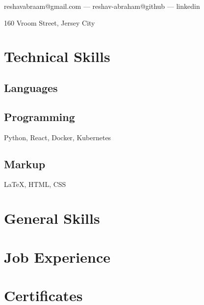 \documentclass{article}
\makeatletter
\renewcommand{\maketitle}{
\begin{center}
{\huge\bfseries
\theauthor}

reshavabraam@gmail.com --- reshav-abraham@github --- linkedin

160 Vroom Street, Jersey City
	
\end{center}
}
\makeatother
\begin{document}
\author{Reshav Abraham}
\date{March 29 2021}
\maketitle
\section{Technical Skills}

\subsection{Languages}

\subsection{Programming}
Python, React, Docker, Kubernetes

\subsection{Markup}
{\LaTeX}, HTML, CSS
\section{General Skills}
\section{Job Experience}
\section{Certificates}
\end{document}
